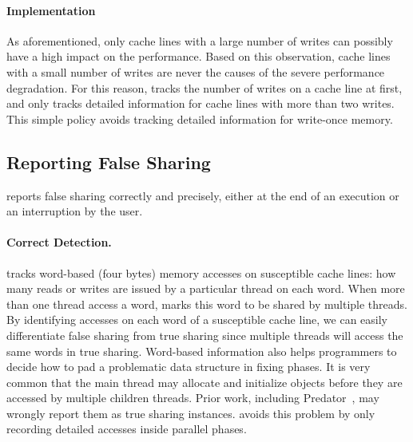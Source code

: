 
\paragraph{Implementation} 
As aforementioned, only cache lines with a large number of writes can possibly have a high impact on the performance. Based on this observation, cache lines with a small number of writes are never the causes of the severe performance degradation. For this reason, \Cheetah{} tracks the number of writes on a cache line at first, and only tracks detailed information for cache lines with more than two writes. This simple policy avoids tracking detailed information for write-once memory. 

 \subsection{Reporting False Sharing}
\label{sec:report}

\Cheetah{} reports false sharing correctly and precisely, either at the end of an execution or an interruption by the user.  

\paragraph{Correct Detection.} \Cheetah{} tracks word-based (four bytes) memory accesses on susceptible cache lines: how many reads or writes are issued by a particular thread on each word. When more than one thread access a word, \Cheetah{} marks this word to be shared by multiple threads. By identifying accesses on each word of a susceptible cache line, we can easily differentiate false sharing from true sharing since multiple threads will access the same words in true sharing. Word-based information also helps programmers to decide how to pad a problematic data structure in fixing phases. It is very common that the main thread  may allocate and initialize objects before they are accessed by multiple children threads. Prior work, including Predator~\cite{Predator}, may wrongly report them as true sharing instances. \cheetah{} avoids this problem by only recording detailed accesses inside parallel phases.

